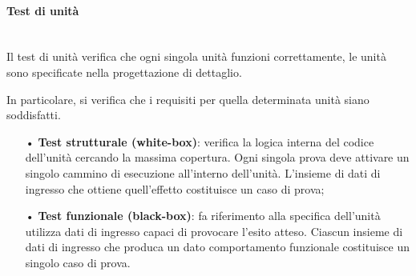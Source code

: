 \paragraph{Test di unità}\mbox{}\\
Il test di unità verifica che ogni singola unità funzioni correttamente, le unità sono specificate nella progettazione di dettaglio.  

In particolare, si verifica che i requisiti per quella determinata unità siano soddisfatti.
\begin{itemize}
\item[•] \textbf{Test strutturale (white-box)}: verifica la logica interna del codice dell’unità cercando la massima copertura. Ogni singola prova deve attivare un singolo cammino di esecuzione all’interno dell’unità. L’insieme di dati di ingresso che ottiene quell’effetto costituisce un caso di prova;
\item[•] \textbf{Test funzionale (black-box)}: fa riferimento alla specifica dell'unità utilizza dati di ingresso capaci di provocare l'esito atteso. Ciascun insieme di dati di ingresso che produca un dato comportamento funzionale costituisce un singolo caso di prova.
\end{itemize}

